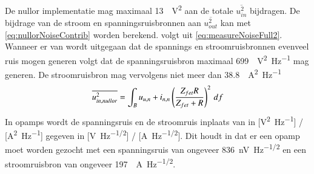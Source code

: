    De nullor implementatie mag maximaal \qty{13}{\pico.\volt^2} aan de totale $\overline{u_{in}^2}$ bijdragen. De bijdrage van de stroom en spanningsruisbronnen aan $\overline{u_{out}^2}$ kan met \cref{eq:nullorNoiseContrib} worden berekend.  volgt uit \cref{eq:measureNoiseFull2}. Wanneer er van wordt uitgegaan dat de spannings en stroomruisbronnen evenveel ruis mogen generen volgt dat de spanningsruisbron maximaal \qty{699}{\femto.\volt\squared\per\hertz} mag generen. De stroomruisbron mag vervolgens niet meer dan \qty{38.8}{\zepto.\ampere\squared\per\hertz}
\begin{equation}\label{eq:nullorNoiseContrib}
    \overline{u_{in,nullor}^2}=\int_Bu_{u,n}+i_{n,n}\left(\frac{Z_{fet}R}{Z_{fet}+R}\right)^2\,df
    \tagaddtext{[\si{\volt\squared}]}
\end{equation}
In opamps wordt de spanningsruis en de stroomruis inplaats van in [\si{\volt\squared\per\hertz}] / [\si{\ampere\squared\per\hertz}] gegeven in [\si{\volt.\hertz^{-1/2}}] / [\si{\ampere.\hertz^{-1/2}}]. Dit houdt in dat er een opamp moet worden gezocht met een spanningsruis van ongeveer \qty{836}{\nano\volt.\hertz^{-1/2}} en een stroomruisbron van ongeveer \qty{197}{\femto.\ampere.\hertz^{-1/2}}.



